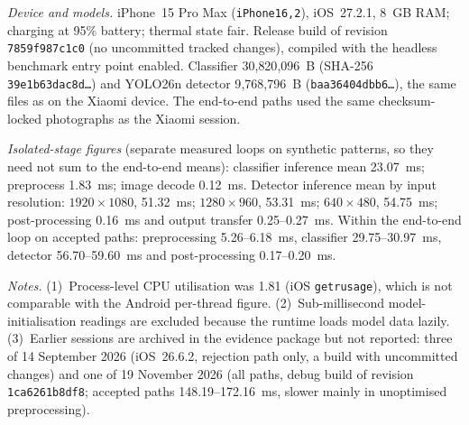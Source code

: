 {\footnotesize
\textit{Device and models.} iPhone~15 Pro Max (\texttt{iPhone16,2}), iOS~27.2.1,
8~GB RAM; charging at 95\% battery; thermal state fair. Release build of revision
\texttt{7859f987c1c0} (no uncommitted tracked changes), compiled with the
headless benchmark entry point enabled. Classifier
30{,}820{,}096~B (SHA-256 \texttt{39e1b63dac8d\ldots}) and YOLO26n detector
9{,}768{,}796~B (\texttt{baa36404dbb6\ldots}), the same files as on the Xiaomi
device. The end-to-end paths used the same checksum-locked photographs as the
Xiaomi session.

\textit{Isolated-stage figures} (separate measured loops on synthetic patterns,
so they need not sum to the end-to-end means): classifier inference mean
23.07~ms; preprocess 1.83~ms; image decode 0.12~ms. Detector inference mean by
input resolution: $1920\times1080$, 51.32~ms; $1280\times960$, 53.31~ms;
$640\times480$, 54.75~ms; post-processing 0.16~ms and output transfer
0.25--0.27~ms. Within the end-to-end loop on accepted paths: preprocessing
5.26--6.18~ms, classifier 29.75--30.97~ms, detector 56.70--59.60~ms and
post-processing 0.17--0.20~ms.

\textit{Notes.} (1)~Process-level CPU utilisation was 1.81 (iOS
\texttt{getrusage}), which is not comparable with the Android per-thread
figure. (2)~Sub-millisecond model-initialisation readings are excluded because
the runtime loads model data lazily. (3)~Earlier sessions are archived in the evidence package but not reported:
three of 14 September 2026 (iOS~26.6.2, rejection path only, a build with
uncommitted changes) and one of 19 November 2026 (all paths, debug build of
revision \texttt{1ca6261b8df8}; accepted paths 148.19--172.16~ms, slower mainly
in unoptimised preprocessing).
\par}
\tabletail
